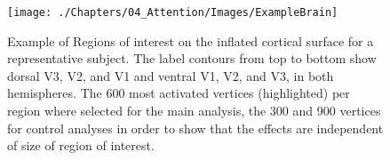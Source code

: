 \begin{figure}[!ht]
\centering
\texttt{[image: ./Chapters/04\_Attention/Images/ExampleBrain]}
\caption{Example of Regions of interest on the inflated cortical surface for a representative subject. The label contours from top to bottom show dorsal V3, V2, and V1 and ventral V1, V2, and V3, in both hemispheres. The 600 most activated vertices (highlighted) per region where selected for the main analysis, the 300 and 900 vertices for control analyses in order to show that the effects are independent of size of region of interest.}
\label{fig:roifigures}
\end{figure}







%
